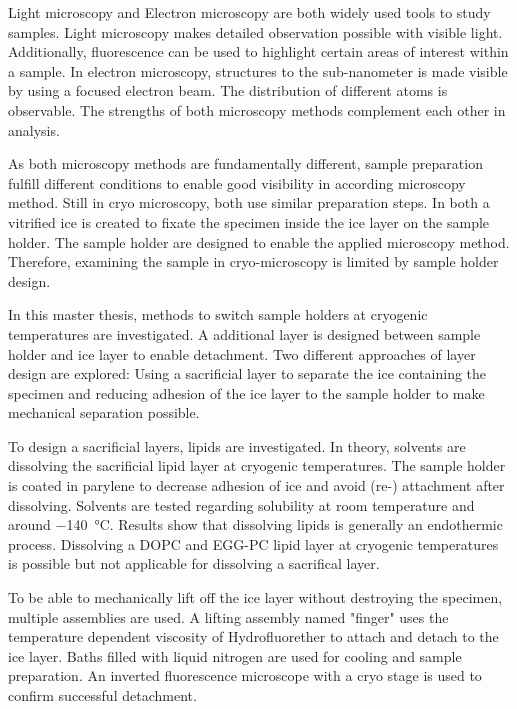 Light microscopy and Electron microscopy are both widely used tools to study samples. Light microscopy makes detailed observation possible with visible light. Additionally, fluorescence can be used to highlight certain areas of interest within a sample. In electron microscopy, structures to the sub-nanometer is made visible by using a focused electron beam. The distribution of different atoms is observable. The strengths of both microscopy methods complement each other in analysis. 

As both microscopy methods are fundamentally different, sample preparation fulfill different conditions to enable good visibility in according microscopy method. Still in cryo microscopy, both use similar preparation steps. In both a vitrified ice  is created to fixate the specimen inside the ice layer on the sample holder. The sample holder are designed to enable the applied microscopy method. Therefore, examining the sample in cryo-microscopy is limited by sample holder design.

In this master thesis, methods to switch sample holders at cryogenic temperatures are investigated. A additional layer is designed between sample holder and ice layer to enable detachment. Two different approaches of layer design are explored: Using a sacrificial layer to separate the ice containing the specimen and reducing adhesion of the ice layer to the sample holder to make mechanical separation possible.

To design a sacrificial layers, lipids are investigated. In theory, solvents are dissolving the sacrificial lipid layer at cryogenic temperatures. The sample holder is coated in parylene to decrease adhesion of ice and avoid (re-) attachment after dissolving. Solvents are tested regarding solubility at room temperature and around \SI{-140}{\degreeCelsius}. Results show that dissolving lipids is generally an endothermic process. Dissolving a DOPC and EGG-PC lipid layer at cryogenic temperatures is possible but not applicable for dissolving a sacrifical layer. 

To be able to mechanically lift off the ice layer without destroying the specimen, multiple assemblies are used. A lifting assembly named "finger" uses the temperature dependent viscosity of Hydrofluorether to attach and detach to the ice layer. Baths filled with liquid nitrogen are used for cooling and sample preparation. An inverted fluorescence microscope with a cryo stage is used to confirm successful detachment.

